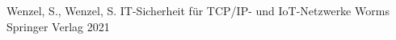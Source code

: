 %
%

\begin{thebibliography}{defaultmarken}
%
%	
	 {
		\bibformat
			{Wenzel, S., Wenzel, S.} %
			{IT-Sicherheit für TCP/IP- und IoT-Netzwerke} %
			{Worms} %
			{Springer Verlag} %
			{2021} %
		{}
	}
%
%
\end{thebibliography}
